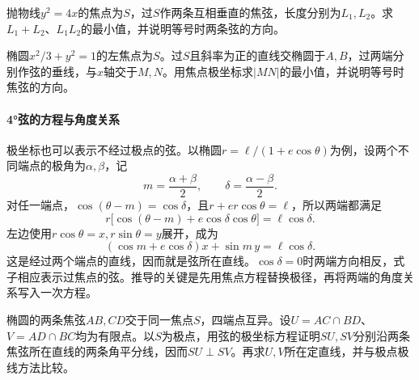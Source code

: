 \par\addvspace{6pt}\noindent\begin{minipage}{\linewidth}
\begin{example}
抛物线\(y^2=4x\)的焦点为\(S\)，过\(S\)作两条互相垂直的焦弦，长度分别为\(L_1,L_2\)。求\(L_1+L_2\)、\(L_1L_2\)的最小值，并说明等号时两条弦的方向。
\end{example}
\end{minipage}\par\addvspace{6pt}


\par\addvspace{6pt}\noindent\begin{minipage}{\linewidth}
\begin{example}\label{ex:quadratic-focal-projection-minimum}
椭圆\(x^2/3+y^2=1\)的左焦点为\(S\)。过\(S\)且斜率为正的直线交椭圆于\(A,B\)，过两端分别作弦的垂线，与\(x\)轴交于\(M,N\)。用焦点极坐标求\(|MN|\)的最小值，并说明等号时焦弦的方向。
\end{example}
\end{minipage}\par\addvspace{6pt}

\newpage
\paragraph{4°弦的方程与角度关系} \mbox{}

极坐标也可以表示不经过极点的弦。以椭圆\(r=\ell/(1+e\cos\theta)\)为例，设两个不同端点的极角为\(\alpha,\beta\)，记
\begin{equation*}
 m=\frac{\alpha+\beta}{2},\qquad
 \delta=\frac{\alpha-\beta}{2}.
\end{equation*}
对任一端点，\(\cos(\theta-m)=\cos\delta\)，且\(r+er\cos\theta=\ell\)，所以两端都满足
\begin{equation}\label{eq:quadratic-focal-polar-chord}
 r\bigl[\cos(\theta-m)+e\cos\delta\cos\theta\bigr]
 =\ell\cos\delta.
\end{equation}
左边使用\(r\cos\theta=x,r\sin\theta=y\)展开，成为
\begin{equation*}
 (\cos m+e\cos\delta)x+\sin m\,y=\ell\cos\delta.
\end{equation*}
这是经过两个端点的直线，因而就是弦所在直线。\(\cos\delta=0\)时两端方向相反，式子相应表示过焦点的弦。推导的关键是先用焦点方程替换极径，再将两端的角度关系写入一次方程。

\par\addvspace{6pt}\noindent\begin{minipage}{\linewidth}
\begin{example}\label{ex:quadratic-focal-cross-chord-angles}
椭圆的两条焦弦\(AB,CD\)交于同一焦点\(S\)，四端点互异。设\(U=AC\cap BD\)、\(V=AD\cap BC\)均为有限点。以\(S\)为极点，用弦的极坐标方程证明\(SU,SV\)分别沿两条焦弦所在直线的两条角平分线，因而\(SU\perp SV\)。再求\(U,V\)所在定直线，并与极点极线方法比较。
\end{example}
\end{minipage}\par\addvspace{6pt}

